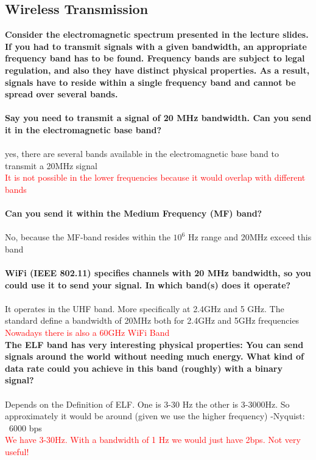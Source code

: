 \documentclass[a4paper,12pt]{article}
\begin{document}
\subsection{Wireless Transmission}
\textbf{Consider the electromagnetic spectrum presented in the lecture slides. If you had to transmit signals  with  a  given  bandwidth, an appropriate frequency band has to be found. Frequency bands are subject to legal regulation, and also they have distinct physical properties. As a result, signals have to reside within a single frequency band and cannot be spread over several bands.}\\
\\
\textbf{Say you need to transmit a signal of 20 MHz bandwidth. Can you send it in the electromagnetic base band?}\\
\\
yes, there are several bands available in the electromagnetic base band to transmit a 20MHz signal\\
\textcolor{red} {It is not possible in the lower frequencies because it would overlap with different bands}\\
\\
\textbf{Can you send it within the Medium Frequency (MF) band?}\\
\\
No, because the MF-band resides within the $10^6$ Hz range and 20MHz exceed this band\\
\\
\textbf{WiFi (IEEE 802.11) specifies channels with 20 MHz bandwidth, so you could use it to send your signal. In which band(s) does it operate?}\\
\\
It operates in the UHF band. More specifically at 2.4GHz and 5 GHz. The standard define a bandwidth of 20MHz both for 2.4GHz and 5GHz frequencies\\
\textcolor{red}{Nowadays there is also a 60GHz WiFi Band}
\\
\textbf{The ELF band has very interesting physical properties: You can send signals around the world  without needing much energy.  What kind  of data rate could you achieve in this  band (roughly) with a binary signal?}\\
\\
Depends on the Definition of ELF. One is 3-30 Hz the other is 3-3000Hz.
So approximately it would be around (given we use the higher frequency)
-Nyquist: ~6000 bps\\
\textcolor{red}{We have 3-30Hz. With a bandwidth of 1 Hz we would just have 2bps. Not very useful!}
\end{document}
